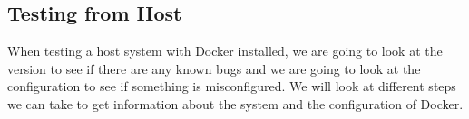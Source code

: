 \subsection{Testing from Host}
When testing a host system with Docker installed, we are going to look at the version to see if there are any known bugs and we are going to look at the configuration to see if something is misconfigured. We will look at different steps we can take to get information about the system and the configuration of Docker.






